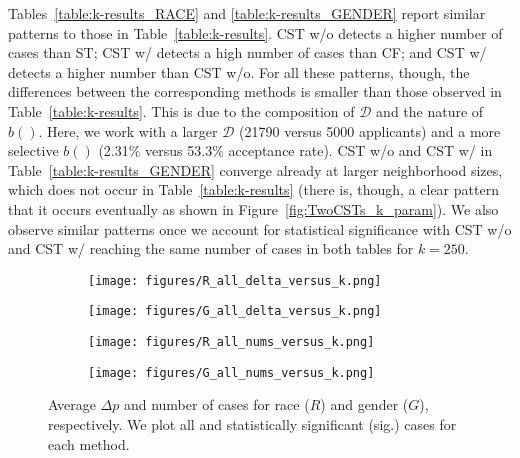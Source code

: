 Tables~\ref{table:k-results_RACE} and \ref{table:k-results_GENDER} report similar patterns to those in Table~\ref{table:k-results}.
CST w/o detects a higher number of cases than ST; CST w/ detects a high number of cases than CF; and CST w/ detects a higher number than CST w/o. 
For all these patterns, though, the differences between the corresponding methods is smaller than those observed in Table~\ref{table:k-results}.
This is due to the composition of $\mathcal{D}$ and the nature of $b()$. 
Here, we work with a larger $\mathcal{D}$ (21790 versus 5000 applicants) and a more selective $b()$ (2.31\% versus 53.3\% acceptance rate).
CST w/o and CST w/ in Table~\ref{table:k-results_GENDER} converge already at larger neighborhood sizes, which does not occur in Table~\ref{table:k-results} (there is, though, a clear pattern that it occurs eventually as shown in Figure~\ref{fig:TwoCSTs_k_param}).
We also observe similar patterns once we account for statistical significance with CST w/o and CST w/ reaching the same number of cases in both tables for $k=250$.

%
\begin{figure}[t]
    \begin{subfigure}{.45\linewidth}
    \texttt{[image: figures/R\_all\_delta\_versus\_k.png]}
    \caption{}
    \end{subfigure}
\hfill
    \begin{subfigure}{.45\linewidth}
    \texttt{[image: figures/G\_all\_delta\_versus\_k.png]}
    \caption{}
    \end{subfigure}
\medskip
   \begin{subfigure}{.45\linewidth}
    \texttt{[image: figures/R\_all\_nums\_versus\_k.png]}
    \caption{}
    \end{subfigure}
\hfill
    \begin{subfigure}{.45\linewidth}
    \texttt{[image: figures/G\_all\_nums\_versus\_k.png]}
    \caption{}
    \end{subfigure}
\caption{Average $\Delta p$ and number of cases for race ($R$) and gender ($G$), respectively. We plot all and statistically significant (sig.) cases for each method.}
\label{fig:LawSchoolSingleDiscrimiantion_allmethods_k_param}
\end{figure}
%

